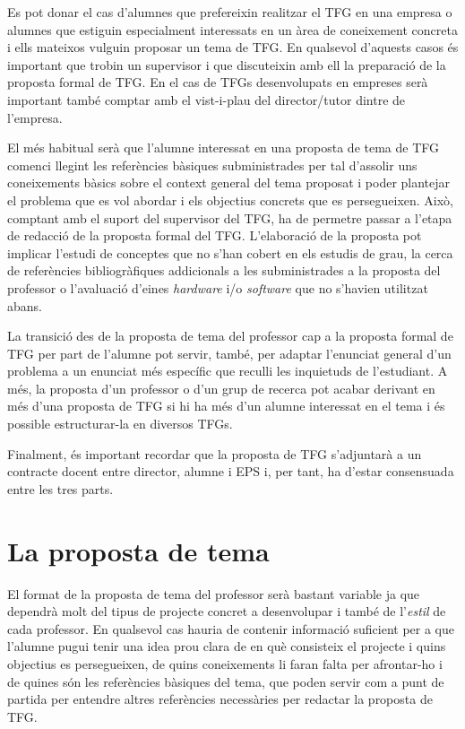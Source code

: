Es pot donar el cas d'alumnes que prefereixin realitzar el \ac{TFG} en una empresa o alumnes que estiguin especialment interessats en un àrea de coneixement concreta i ells mateixos vulguin proposar un tema de \ac{TFG}. En qualsevol d'aquests casos és important que trobin un supervisor i que discuteixin amb ell la preparació de la proposta formal de \ac{TFG}. En el cas de \ac{TFG}s desenvolupats en empreses serà important també comptar amb el vist-i-plau del director/tutor dintre de l'empresa.

El més habitual serà que l'alumne interessat en una proposta de tema de \ac{TFG} comenci llegint les referències bàsiques subministrades per tal d'assolir uns coneixements bàsics sobre el context general del tema proposat i poder plantejar el problema que es vol abordar i els objectius concrets que es persegueixen. Això, comptant amb el suport del supervisor del \ac{TFG}, ha de permetre passar a l'etapa de redacció de la proposta formal del \ac{TFG}. L'elaboració de la proposta pot implicar l'estudi de conceptes que no s'han cobert en els estudis de grau, la cerca de referències bibliogràfiques addicionals a les subministrades a la proposta del professor o l'avaluació d'eines \emph{hardware} i/o \emph{software} que no s'havien utilitzat abans.

La transició des de la proposta de tema del professor cap a la proposta formal de \ac{TFG} per part de l'alumne pot servir, també, per adaptar l'enunciat general d'un problema a un enunciat més específic que reculli les inquietuds de l'estudiant. A més, la proposta d'un professor o d'un grup de recerca pot acabar derivant en més d'una proposta de \ac{TFG} si hi ha més d'un alumne interessat en el tema i és possible estructurar-la en diversos \ac{TFG}s.

Finalment, és important recordar que la proposta de \ac{TFG} s'adjuntarà a un contracte docent entre director, alumne i \ac{EPS} i, per tant, ha d'estar consensuada entre les tres parts.


\section{La proposta de tema}

El format de la proposta de tema del professor serà bastant variable ja que dependrà molt del tipus de projecte concret a desenvolupar i també de l'\emph{estil} de cada professor. En qualsevol cas hauria de contenir informació suficient per a que l'alumne pugui tenir una idea prou clara de en què consisteix el projecte i quins objectius es persegueixen, de quins coneixements li faran falta per afrontar-ho i de quines són les referències bàsiques del tema, que poden servir com a punt de partida per entendre altres referències necessàries per redactar la proposta de \ac{TFG}.

